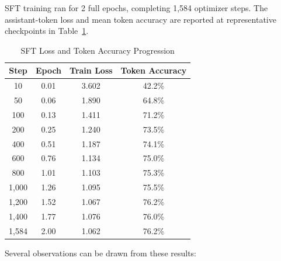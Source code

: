 \documentclass[12pt,a4paper]{report}
\begin{document}
SFT training ran for 2 full epochs, completing 1,584 optimizer steps. The
assistant-token loss and mean token accuracy are reported at representative
checkpoints in Table~\ref{tab:sft_loss}.
 \newpage
\begin{table}[h]
\centering
\caption{SFT Loss and Token Accuracy Progression}
\label{tab:sft_loss}
\begin{tabular}{cccc}
\toprule
\textbf{Step} & \textbf{Epoch} & \textbf{Train Loss} & \textbf{Token Accuracy} \\
\midrule
10      & 0.01 & 3.602 & 42.2\% \\
50      & 0.06 & 1.890 & 64.8\% \\
100     & 0.13 & 1.411 & 71.2\% \\
200     & 0.25 & 1.240 & 73.5\% \\
400     & 0.51 & 1.187 & 74.1\% \\
600     & 0.76 & 1.134 & 75.0\% \\
800     & 1.01 & 1.103 & 75.3\% \\
1{,}000 & 1.26 & 1.095 & 75.5\% \\
1{,}200 & 1.52 & 1.067 & 76.2\% \\
1{,}400 & 1.77 & 1.076 & 76.0\% \\
1{,}584 & 2.00 & 1.062 & 76.2\% \\
\bottomrule
\end{tabular}
\end{table}

Several observations can be drawn from these results:
\end{document}
